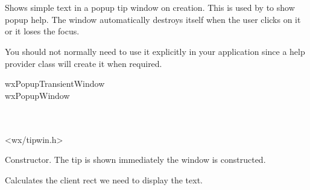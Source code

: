\section{}\label{wxtipwindow}

Shows simple text in a popup tip window on creation. This is used by  to
show popup help. The window automatically destroys itself when the user clicks on it or it loses
the focus.

You should not normally need to use it explicitly in your application since a help provider class
will create it when required.


wxPopupTransientWindow\\
wxPopupWindow\\
\\
\\


<wx/tipwin.h>


\label{wxtipwindowwxtipwindow}


Constructor. The tip is shown immediately the window is constructed.

\label{wxtipwindowadjust}


Calculates the client rect we need to display the text.

